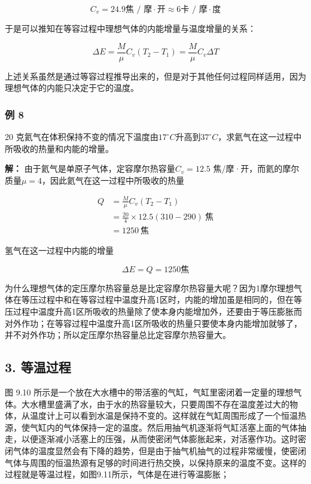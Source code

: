 \[
C _ {v} = 24.9 \text{焦 / 摩} \cdot \text{开} \approx 6 \text{卡 / 摩} \cdot \text{度}
\]

于是可以推知在等容过程中理想气体的内能增量与温度增量的关系：

\[
\Delta E=\frac{M}{\mu}C_v(T_2-T_1)=\frac{M}{\mu}C_v\Delta T \tag{9.12}
\]

上述关系虽然是通过等容过程推导出来的，但是对于其他任何过程同样适用，因为理想气体的内能只决定于它的温度。

\subsubsection{例 8}\label{ux4f8b-8-4}

20
克氦气在体积保持不变的情况下温度由\(17^{\circ}C\)升高到\(37^{\circ}C\)，求氦气在这一过程中所吸收的热量和内能的增量。

\textbf{解：} 由于氦气是单原子气体，定容摩尔热容量\(C_{v}=12.5\)
焦/摩·开，而氦的摩尔质量\(\mu = 4\)，因此氦气在这一过程中所吸收的热量

\[
\begin{aligned}Q&=\frac{M}{\mu}C_v(T_2-T_1)\\&=\frac{20}{4}\times12.5(310-290)\ \text{焦}\\&=1250\ \text{焦}\end{aligned}
\]

氢气在这一过程中内能的增量

\[
\Delta E = Q = 1250 \text{焦}
\]

为什么理想气体的定压摩尔热容量总是比定容摩尔热容量大呢？因为1摩尔理想气体在等压过程中和在等容过程中温度升高1区时，内能的增加虽是相同的，但在等压过程中温度升高1区所吸收的热量除了使本身内能增加外，还要由于等压膨胀而对外作功；在等容过程中温度升高1区所吸收的热量只要使本身内能增加就够了，并不对外作功；所以定压摩尔热容量总比定容摩尔热容量大。

\subsection{3. 等温过程}\label{ux7b49ux6e29ux8fc7ux7a0b}

图 9.10
所示是一个放在大水槽中的带活塞的气缸，气缸里密闭着一定量的理想气体。大水槽里盛满了水，由于水的热容量较大，只要周围不存在温度差过大的物体，从温度计上可以看到水温是保持不变的。这样就在气缸周围形成了一个恒温热源，使气缸内的气体保持一定的温度。然后用抽气机逐渐将气缸活塞上面的气体抽走，以便逐渐减小活塞上的压强，从而使密闭气体膨胀起来，对活塞作功。这时密闭气体的温度显然会有下降的趋势，但是由于抽气机抽气的过程非常缓慢，使密闭气体与周围的恒温热源有足够的时间进行热交换，以保持原来的温度不变。这样的过程就是等温过程，如图9.11所示，气体是在进行等温膨胀；

